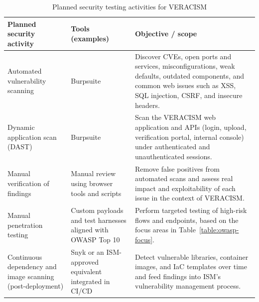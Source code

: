 \begin{table}[htbp]
  \centering
  \smalltable
  \footnotesize
  {%
  \setlength{\tabcolsep}{8pt}
  \renewcommand{\arraystretch}{1.3}
  \begin{tabular}{|>{\raggedright\arraybackslash}p{3.6cm}|
                  >{\raggedright\arraybackslash}p{4.4cm}|
                  >{\raggedright\arraybackslash}p{4.4cm}|}
    \hline
    \textbf{Planned security activity} &
    \textbf{Tools (examples)} &
    \textbf{Objective / scope} \\
    \hline\hline

    Automated vulnerability scanning &
    Burpsuite &
    Discover CVEs, open ports and services, misconfigurations, weak defaults,
    outdated components, and common web issues such as XSS, SQL injection,
    CSRF, and insecure headers. \\
    \hline

    Dynamic application scan (DAST) &
    Burpsuite &
    Scan the VERACISM web application and APIs (login, upload, verification
    portal, internal console) under authenticated and unauthenticated sessions. \\
    \hline

    Manual verification of findings &
    Manual review using browser tools and scripts &
    Remove false positives from automated scans and assess real impact and
    exploitability of each issue in the context of VERACISM. \\
    \hline

    Manual penetration testing &
    Custom payloads and test harnesses aligned with OWASP Top 10 &
    Perform targeted testing of high-risk flows and endpoints, based on the
    focus areas in Table~\ref{table:owasp-focus}. \\
    \hline

    Continuous dependency and image scanning (post-deployment) &
    Snyk or an ISM-approved equivalent integrated in CI/CD &
    Detect vulnerable libraries, container images, and IaC templates over time
    and feed findings into ISM's vulnerability management process. \\
    \hline
  \end{tabular}
  }%
  \captionsetup{type=table}
  \caption{Planned security testing activities for VERACISM}
  \label{table:security-testing-plan}
\end{table}

